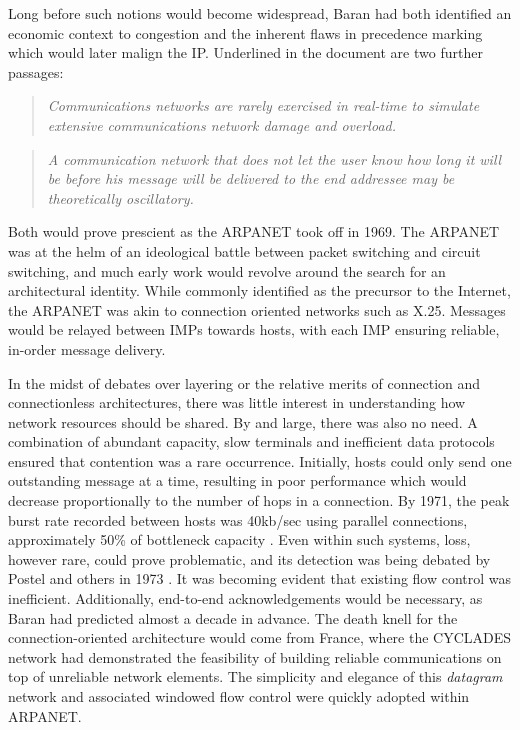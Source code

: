 Long before such notions would become widespread, Baran had both identified an economic context to congestion and the inherent flaws in precedence marking which would later malign the \ac{IP}. Underlined in the document are two further passages:


\begin{quote}
\textit{
    Communications networks are rarely exercised in real-time to simulate extensive communications network damage and overload.
}
\end{quote}
\begin{quote}
\textit{
    A communication network that does not let the user know how long it will be before his message will be delivered to the end addressee may be theoretically oscillatory.
}
\end{quote}

Both would prove prescient as the \ac{ARPANET} took off in 1969. 
The \ac{ARPANET} was at the helm of an ideological battle between packet switching and circuit switching, and much early work would revolve around the search for an architectural identity. 
While commonly identified as the precursor to the Internet, the \ac{ARPANET} was akin to connection oriented networks such as X.25. Messages would be relayed between \acp{IMP} towards hosts, with each \ac{IMP} ensuring reliable, in-order message delivery.

In the midst of debates over layering or the relative merits of connection and connectionless architectures, there was little interest in understanding how network resources should be shared.  
By and large, there was also no need. 
A combination of abundant capacity, slow terminals and inefficient data protocols ensured that contention was a rare occurrence. 
Initially, hosts could only send one outstanding message at a time, resulting in poor performance which would decrease proportionally to the number of hops in a connection.
By 1971, the peak burst rate recorded between hosts was 40kb/sec using parallel connections, approximately 50\% of bottleneck capacity \cite{Cerf:1974p455}.
Even within such systems, loss, however rare, could prove problematic, and its detection was being debated by Postel and others in 1973 \cite{Postel:1973p462,Hathaway:1973p461}.
It was becoming evident that existing flow control was inefficient. Additionally, end-to-end acknowledgements would be necessary, as Baran had predicted almost a decade in advance.
The death knell for the connection-oriented architecture would come from France, where the CYCLADES \cite{Pouzin:1973p551} network had demonstrated the feasibility of building reliable communications on top of unreliable network elements. 
The simplicity and elegance of this \textit{datagram} network and associated windowed flow control were quickly adopted within \ac{ARPANET}.

